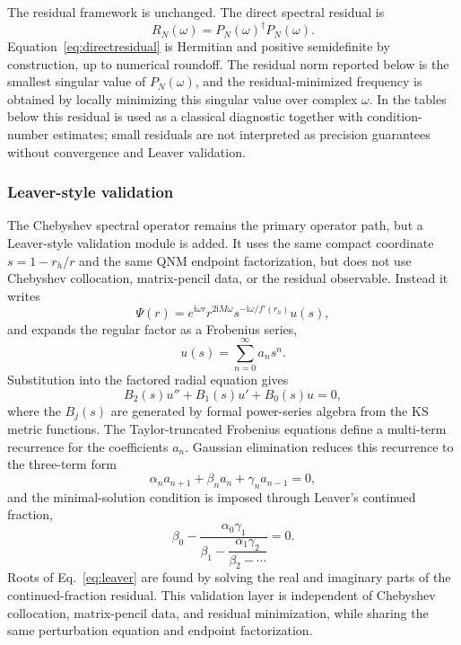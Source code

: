 ﻿\documentclass[12pt,a4paper]{article}
\newcommand{\ii}{\mathrm{i}}
\begin{document}
The residual framework is unchanged. The direct spectral residual is
\begin{equation}
R_N(\omega)=P_N(\omega)^\dagger P_N(\omega).
\label{eq:directresidual}
\end{equation}
Equation~\eqref{eq:directresidual} is Hermitian and positive semidefinite by construction, up to numerical roundoff. The residual norm reported below is the smallest singular value of \(P_N(\omega)\), and the residual-minimized frequency is obtained by locally minimizing this singular value over complex \(\omega\). In the tables below this residual is used as a classical diagnostic together with condition-number estimates; small residuals are not interpreted as precision guarantees without convergence and Leaver validation.

\subsubsection{Leaver-style validation}

The Chebyshev spectral operator remains the primary operator path, but a Leaver-style validation module is added. It uses the same compact coordinate \(s=1-r_h/r\) and the same QNM endpoint factorization, but does not use Chebyshev collocation, matrix-pencil data, or the residual observable. Instead it writes
\begin{equation*}
\Psi(r)=e^{\ii\omega r}r^{2\ii M\omega}s^{-\ii\omega/f'(r_h)}u(s),
\end{equation*}
and expands the regular factor as a Frobenius series,
\begin{equation*}
u(s)=\sum_{n=0}^{\infty} a_n s^n.
\end{equation*}
Substitution into the factored radial equation gives
\begin{equation*}
B_2(s)u''+B_1(s)u'+B_0(s)u=0,
\end{equation*}
where the \(B_j(s)\) are generated by formal power-series algebra from the KS metric functions. The Taylor-truncated Frobenius equations define a multi-term recurrence for the coefficients \(a_n\). Gaussian elimination reduces this recurrence to the three-term form
\begin{equation*}
\alpha_n a_{n+1}+\beta_n a_n+\gamma_n a_{n-1}=0,
\end{equation*}
and the minimal-solution condition is imposed through Leaver's continued fraction,
\begin{equation}
\beta_0-\frac{\alpha_0\gamma_1}{\beta_1-\dfrac{\alpha_1\gamma_2}{\beta_2-\cdots}}=0.
\label{eq:leaver}
\end{equation}
Roots of Eq.~\eqref{eq:leaver} are found by solving the real and imaginary parts of the continued-fraction residual. This validation layer is independent of Chebyshev collocation, matrix-pencil data, and residual minimization, while sharing the same perturbation equation and endpoint factorization.
\end{document}
